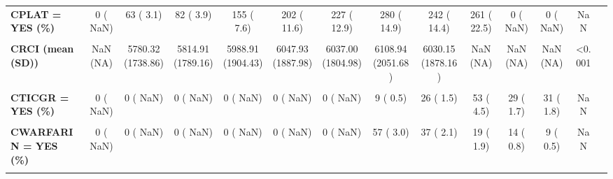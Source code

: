 \documentclass[
]{article}
\begin{document}
\begin{table}[H]
\begin{tabular}[t]{>{\raggedright\arraybackslash}p{5em}ccccccccccccc}
\textbf{CPLAT = YES (\%)} & 0 (  NaN) & 63 (  3.1) & 82 (  3.9) & 155 (  7.6) & 202 ( 11.6) & 227 ( 12.9) & 280 ( 14.9) & 242 ( 14.4) & 261 ( 22.5) & 0 (  NaN) & 0 (  NaN) & NaN & \\
\textbf{\cellcolor{gray!10}{CPRAS = YES (\%)}} & \cellcolor{gray!10}{0 (  NaN)} & \cellcolor{gray!10}{0 (  NaN)} & \cellcolor{gray!10}{0 (  NaN)} & \cellcolor{gray!10}{0 (  NaN)} & \cellcolor{gray!10}{0 (  NaN)} & \cellcolor{gray!10}{0 (  NaN)} & \cellcolor{gray!10}{18 (  1.0)} & \cellcolor{gray!10}{23 (  1.3)} & \cellcolor{gray!10}{19 (  1.6)} & \cellcolor{gray!10}{26 (  1.5)} & \cellcolor{gray!10}{27 (  1.5)} & \cellcolor{gray!10}{NaN} & \cellcolor{gray!10}{}\\
\textbf{CRCI (mean (SD))} & NaN (NA) & 5780.32 (1738.86) & 5814.91 (1789.16) & 5988.91 (1904.43) & 6047.93 (1887.98) & 6037.00 (1804.98) & 6108.94 (2051.68) & 6030.15 (1878.16) & NaN (NA) & NaN (NA) & NaN (NA) & <0.001 & \\
\textbf{\cellcolor{gray!10}{CSMOK = YES (\%)}} & \cellcolor{gray!10}{615 ( 35.3)} & \cellcolor{gray!10}{681 ( 33.3)} & \cellcolor{gray!10}{717 ( 34.2)} & \cellcolor{gray!10}{778 ( 38.1)} & \cellcolor{gray!10}{679 ( 38.9)} & \cellcolor{gray!10}{670 ( 38.4)} & \cellcolor{gray!10}{740 ( 39.3)} & \cellcolor{gray!10}{690 ( 38.5)} & \cellcolor{gray!10}{764 ( 43.0)} & \cellcolor{gray!10}{723 ( 41.3)} & \cellcolor{gray!10}{685 ( 39.0)} & \cellcolor{gray!10}{<0.001} & \cellcolor{gray!10}{}\\
\textbf{CTICGR = YES (\%)} & 0 (  NaN) & 0 (  NaN) & 0 (  NaN) & 0 (  NaN) & 0 (  NaN) & 0 (  NaN) & 9 (  0.5) & 26 (  1.5) & 53 (  4.5) & 29 (  1.7) & 31 (  1.8) & NaN & \\
\textbf{\cellcolor{gray!10}{CVA\_TIA = YES (\%)}} & \cellcolor{gray!10}{19 (  1.1)} & \cellcolor{gray!10}{18 (  0.9)} & \cellcolor{gray!10}{14 (  0.7)} & \cellcolor{gray!10}{21 (  1.0)} & \cellcolor{gray!10}{14 (  0.8)} & \cellcolor{gray!10}{10 (  0.6)} & \cellcolor{gray!10}{15 (  0.8)} & \cellcolor{gray!10}{11 (  0.6)} & \cellcolor{gray!10}{0 (  NaN)} & \cellcolor{gray!10}{0 (  NaN)} & \cellcolor{gray!10}{0 (  NaN)} & \cellcolor{gray!10}{NaN} & \cellcolor{gray!10}{}\\
\textbf{CWARFARIN = YES (\%)} & 0 (  NaN) & 0 (  NaN) & 0 (  NaN) & 0 (  NaN) & 0 (  NaN) & 0 (  NaN) & 57 (  3.0) & 37 (  2.1) & 19 (  1.9) & 14 (  0.8) & 9 (  0.5) & NaN & \\
\textbf{\cellcolor{gray!10}{DACEARB = YES (\%)}} & \cellcolor{gray!10}{996 ( 55.5)} & \cellcolor{gray!10}{1373 ( 67.0)} & \cellcolor{gray!10}{1482 ( 70.8)} & \cellcolor{gray!10}{1524 ( 76.3)} & \cellcolor{gray!10}{1277 ( 74.7)} & \cellcolor{gray!10}{1401 ( 79.5)} & \cellcolor{gray!10}{1419 ( 75.6)} & \cellcolor{gray!10}{1305 ( 81.5)} & \cellcolor{gray!10}{1304 ( 91.4)} & \cellcolor{gray!10}{1255 ( 71.7)} & \cellcolor{gray!10}{1071 ( 61.0)} & \cellcolor{gray!10}{<0.001} & \cellcolor{gray!10}{}\\

\end{tabular}
\end{table}
\end{document}
